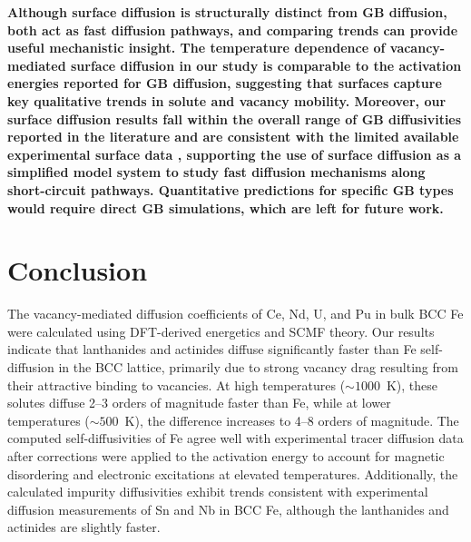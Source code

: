 \documentclass[preprint,12pt]{elsarticle}
\providecommand{\DIFaddtex}[1]{{\bf #1}} %
\providecommand{\DIFaddbegin}{\protect\color{blue}} %
\providecommand{\DIFaddend}{\protect\color{black}} %
\providecommand{\DIFadd}[1]{\texorpdfstring{\DIFaddtex{#1}}{#1}} %
\newcommand{\DIFaddincludegraphics}[2][]{{\color{blue}\fbox{\DIFOincludegraphics[#1]{#2}}}} %
\DeclareRobustCommand{\DIFaddbegin}{\DIFOaddbegin \let\includegraphics\DIFaddincludegraphics} %
\DeclareRobustCommand{\DIFaddend}{\DIFOaddend \let\includegraphics\DIFOincludegraphics} %
\begin{document}
\DIFaddbegin \DIFadd{Although surface diffusion is structurally distinct from GB diffusion, both act as fast diffusion pathways, and comparing trends can provide useful mechanistic insight. The temperature dependence of vacancy-mediated surface diffusion in our study is comparable to the activation energies reported for GB diffusion, suggesting that surfaces capture key qualitative trends in solute and vacancy mobility. Moreover, our surface diffusion results fall within the overall range of GB diffusivities reported in the literature and are consistent with the limited available experimental surface data \cite{taylor2024directly}, supporting the use of surface diffusion as a simplified model system to study fast diffusion mechanisms along short-circuit pathways. Quantitative predictions for specific GB types would require direct GB simulations, which are left for future work.
}


\DIFaddend %


\FloatBarrier

\section{Conclusion}
\noindent The vacancy-mediated diffusion coefficients of Ce, Nd, U, and Pu in bulk BCC Fe were calculated using DFT-derived energetics and SCMF theory. Our results indicate that lanthanides and actinides diffuse significantly faster than Fe self-diffusion in the BCC lattice, primarily due to strong vacancy drag resulting from their attractive binding to vacancies. At high temperatures ($\sim1000$~K), these solutes diffuse 2–3 orders of magnitude faster than Fe, while at lower temperatures ($\sim500$~K), the difference increases to 4–8 orders of magnitude.
The computed self-diffusivities of Fe agree well with experimental tracer diffusion data after corrections were applied to the activation energy to account for magnetic disordering and electronic excitations at elevated temperatures. Additionally, the calculated impurity diffusivities exhibit trends consistent with experimental diffusion measurements of Sn and Nb in BCC Fe, although the lanthanides and actinides are slightly faster.
\end{document}
